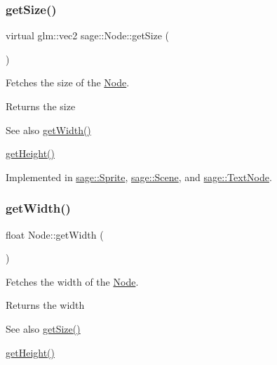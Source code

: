 \subsubsection{\texorpdfstring{getSize()}{getSize()}}
{\footnotesize\ttfamily virtual glm\+::vec2 sage\+::\+Node\+::get\+Size (\begin{DoxyParamCaption}{ }\end{DoxyParamCaption})\hspace{0.3cm}{\ttfamily [pure virtual]}}



Fetches the size of the \mbox{\hyperlink{classsage_1_1Node}{Node}}. 

\begin{DoxyReturn}{Returns}
the size 
\end{DoxyReturn}
\begin{DoxySeeAlso}{See also}
\mbox{\hyperlink{classsage_1_1Node_a65163ffabcfe9f482282ea37ead6fc5f}{get\+Width()}} 

\mbox{\hyperlink{classsage_1_1Node_a6af5a8378ac8d2c3490adbc2a03f1247}{get\+Height()}} 
\end{DoxySeeAlso}


Implemented in \mbox{\hyperlink{classsage_1_1Sprite_ab6c3b12b45eeafab8e816207158121a1}{sage\+::\+Sprite}}, \mbox{\hyperlink{classsage_1_1Scene_a00e53fc54466062ecc1437b980f5fa69}{sage\+::\+Scene}}, and \mbox{\hyperlink{classsage_1_1TextNode_ac5aa86ad68f3470c50f7021695a6c45d}{sage\+::\+Text\+Node}}.

\mbox{\label{classsage_1_1Node_a65163ffabcfe9f482282ea37ead6fc5f}} 
\subsubsection{\texorpdfstring{getWidth()}{getWidth()}}
{\footnotesize\ttfamily float Node\+::get\+Width (\begin{DoxyParamCaption}{ }\end{DoxyParamCaption})}



Fetches the width of the \mbox{\hyperlink{classsage_1_1Node}{Node}}. 

\begin{DoxyReturn}{Returns}
the width 
\end{DoxyReturn}
\begin{DoxySeeAlso}{See also}
\mbox{\hyperlink{classsage_1_1Node_a286d3b5b0d16d31991b58cab972fb03b}{get\+Size()}} 

\mbox{\hyperlink{classsage_1_1Node_a6af5a8378ac8d2c3490adbc2a03f1247}{get\+Height()}} 
\end{DoxySeeAlso}
\mbox{\label{classsage_1_1Node_a8e9bb673c18c8637fb2bba6a0e2a8653}} 
